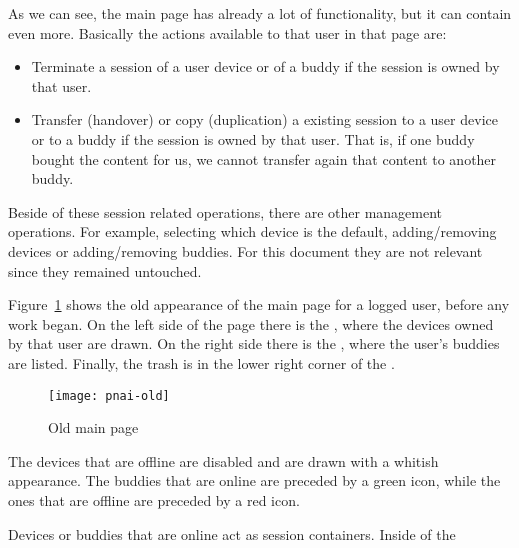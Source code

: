 As we can see, the main  page has already a lot of functionality, but it can contain even more. Basically the actions available to that user in that page are:

\begin{itemize}
  \item Terminate a session of a user device or of a buddy if the session is owned by that user.
  \item Transfer (handover) or copy (duplication) a existing session to a user device or to a buddy if the session is owned by that user. That is, if one buddy bought the content for us, we cannot transfer again that content to another buddy.
\end{itemize}

Beside of these session related operations, there are other management operations.
For example, selecting which device is the default, adding/removing devices or adding/removing buddies.
For this document they are not relevant since they remained untouched.

Figure~\ref{fig:pnai-old} shows the old appearance of the main page for a logged user, before any work began.
On the left side of the page there is the , where the devices owned by that user are drawn.
On the right side there is the , where the user's buddies are listed.
Finally, the trash is in the lower right corner of the . 

\begin{figure}[htbp]
  \centering
    \texttt{[image: pnai-old]}
  \caption{Old main  page}
  \label{fig:pnai-old}
\end{figure}

The devices that are offline are disabled and are drawn with a whitish appearance.
The buddies that are online are preceded by a green icon, while the ones that are offline are preceded by a red icon.

Devices or buddies that are online act as session containers. Inside of the 




